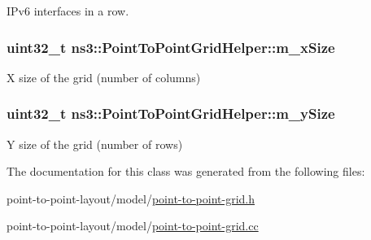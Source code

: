 I\+Pv6 interfaces in a row. 

\subsubsection[{\texorpdfstring{m\+\_\+x\+Size}{m_xSize}}]{\setlength{\rightskip}{0pt plus 5cm}uint32\+\_\+t ns3\+::\+Point\+To\+Point\+Grid\+Helper\+::m\+\_\+x\+Size\hspace{0.3cm}{\ttfamily [private]}}\hypertarget{classns3_1_1PointToPointGridHelper_a9ef53d8b246260fff4a3d6387e6e31d2}{}\label{classns3_1_1PointToPointGridHelper_a9ef53d8b246260fff4a3d6387e6e31d2}


X size of the grid (number of columns) 

\subsubsection[{\texorpdfstring{m\+\_\+y\+Size}{m_ySize}}]{\setlength{\rightskip}{0pt plus 5cm}uint32\+\_\+t ns3\+::\+Point\+To\+Point\+Grid\+Helper\+::m\+\_\+y\+Size\hspace{0.3cm}{\ttfamily [private]}}\hypertarget{classns3_1_1PointToPointGridHelper_a36acac228174edc92454672bc2fe8ccd}{}\label{classns3_1_1PointToPointGridHelper_a36acac228174edc92454672bc2fe8ccd}


Y size of the grid (number of rows) 



The documentation for this class was generated from the following files\+:\begin{DoxyCompactItemize}
\item 
point-\/to-\/point-\/layout/model/\hyperlink{point-to-point-grid_8h}{point-\/to-\/point-\/grid.\+h}\item 
point-\/to-\/point-\/layout/model/\hyperlink{point-to-point-grid_8cc}{point-\/to-\/point-\/grid.\+cc}\end{DoxyCompactItemize}
